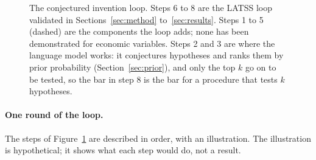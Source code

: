 \documentclass[11pt]{article}
\begin{document}
\begin{figure}[htbp]
\caption{The conjectured invention loop. Steps 6 to 8 are the LATSS loop validated in
Sections~\ref{sec:method} to~\ref{sec:results}. Steps 1 to 5 (dashed) are the components the loop adds;
none has been demonstrated for economic variables. Steps 2 and 3 are where the language model works: it conjectures
hypotheses and ranks them by prior probability (Section~\ref{sec:prior}), and only the top $k$ go on to
be tested, so the bar in step 8 is the bar for a procedure that tests $k$ hypotheses.}
\label{fig:inventionloop}
\end{figure}

\paragraph{One round of the loop.} The steps of Figure~\ref{fig:inventionloop} are described in order,
with an illustration. The illustration is hypothetical; it shows what each step would do, not a result.
\end{document}
